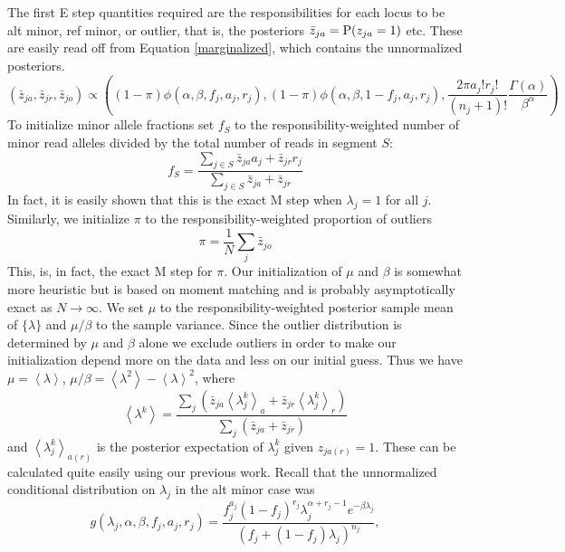 \documentclass[nofootinbib,amssymb,amsmath]{revtex4}
\newcommand{\ave}[1]{\left\langle #1 \right\rangle}
\begin{document}
The first E step quantities required are the responsibilities for each locus to be alt minor, ref minor, or outlier, that is, the posteriors $\bar{z}_{ja} = {\rm P}(z_{ja} = 1)$ etc.  These are easily read off from Equation \ref{marginalized}, which contains the unnormalized posteriors.
%
\begin{equation}
\left( \bar{z}_{ja}, \bar{z}_{jr}, \bar{z}_{jo} \right) \propto
\left(  (1-\pi)\phi(\alpha, \beta, f_j, a_j, r_j) , (1-\pi)\phi(\alpha, \beta, 1-f_j, a_j, r_j) ,  \frac{2 \pi a_j! r_j!}{(n_j + 1)!} \frac{\Gamma(\alpha)}{\beta^\alpha}  \right)
\label{responsibilities}
\end{equation}
%
To initialize minor allele fractions set $f_S$ to the responsibility-weighted number of minor read alleles divided by the total number of reads in segment $S$:
%
\begin{equation}
f_S = \frac{\sum_{j \in S} \bar{z}_{ja} a_j + \bar{z}_{jr} r_j}{\sum_{j \in S} \bar{z}_{ja} + \bar{z}_{jr}}
\end{equation}
%
In fact, it is easily shown that this is the exact M step when $\lambda_j = 1$ for all $j$.  Similarly, we initialize $\pi$ to the responsibility-weighted proportion of outliers
\begin{equation}
\pi = \frac{1}{N} \sum_j \bar{z}_{jo}
\end{equation}
%
This, is, in fact, the exact M step for $\pi$.  Our initialization of $\mu$ and $\beta$ is somewhat more heuristic but is based on moment matching and is probably asymptotically exact as $N \rightarrow \infty$.  We set $\mu$ to the responsibility-weighted posterior sample mean of $\{ \lambda \}$ and $\mu/\beta$ to the sample variance.  Since the outlier distribution is determined by $\mu$ and $\beta$ alone we exclude outliers in order to make our initialization depend more on the data and less on our initial guess.  Thus we have $\mu = \ave{\lambda}$, $\mu/\beta = \ave{\lambda^2} - \ave{\lambda}^2$, where
%
\begin{equation}
\ave{\lambda^k} = \frac{\sum_j \left( \bar{z}_{ja} \ave{\lambda^k_j}_a +  \bar{z}_{jr} \ave{\lambda^k_j}_r \right)}{\sum_j \left( \bar{z}_{ja} +  \bar{z}_{jr} \right)}
\end{equation}
and $\ave{\lambda^k_j}_{a(r)}$ is the posterior expectation of $\lambda^k_j$ given $z_{ja(r)} = 1$.  These can be calculated quite easily using our previous work.  Recall that the unnormalized conditional distribution on $\lambda_j$ in the alt minor case was
%
\begin{equation}
g(\lambda_j, \alpha, \beta, f_j, a_j, r_j) = \frac{ f_j^{a_j} (1 - f_j)^{r_j}  \lambda_j^{\alpha + r_j - 1} e^{-\beta \lambda_j}}{ \left( f_j + (1-f_j) \lambda_j \right)^{n_j}},
\end{equation}
\end{document}
